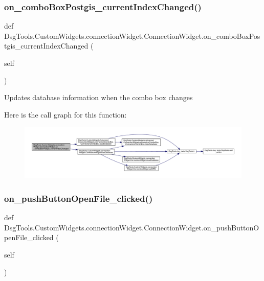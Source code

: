 \subsubsection{\texorpdfstring{on\+\_\+combo\+Box\+Postgis\+\_\+current\+Index\+Changed()}{on\_comboBoxPostgis\_currentIndexChanged()}}
{\footnotesize\ttfamily def Dsg\+Tools.\+Custom\+Widgets.\+connection\+Widget.\+Connection\+Widget.\+on\+\_\+combo\+Box\+Postgis\+\_\+current\+Index\+Changed (\begin{DoxyParamCaption}\item[{}]{self }\end{DoxyParamCaption})}

\begin{DoxyVerb}Updates database information when the combo box changes
\end{DoxyVerb}
 Here is the call graph for this function\+:
\nopagebreak
\begin{figure}[H]
\begin{center}
\leavevmode
\includegraphics[width=350pt]{class_dsg_tools_1_1_custom_widgets_1_1connection_widget_1_1_connection_widget_a111369eb95d1564237c0ebd816696db5_cgraph}
\end{center}
\end{figure}
\mbox{\label{class_dsg_tools_1_1_custom_widgets_1_1connection_widget_1_1_connection_widget_a6333c3b12ad8e2d0e48bd79f839a22b6}} 
\subsubsection{\texorpdfstring{on\+\_\+push\+Button\+Open\+File\+\_\+clicked()}{on\_pushButtonOpenFile\_clicked()}}
{\footnotesize\ttfamily def Dsg\+Tools.\+Custom\+Widgets.\+connection\+Widget.\+Connection\+Widget.\+on\+\_\+push\+Button\+Open\+File\+\_\+clicked (\begin{DoxyParamCaption}\item[{}]{self }\end{DoxyParamCaption})}

